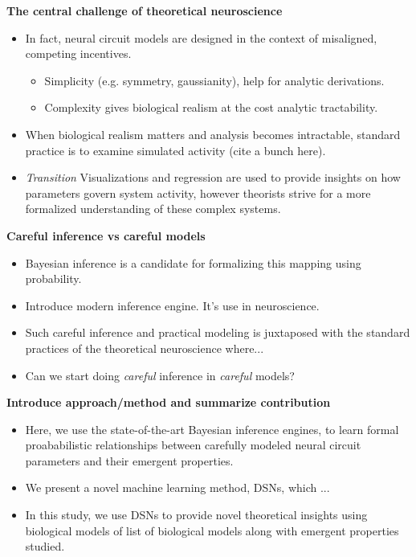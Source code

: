 \documentclass[11pt]{article}
\begin{document}
\textbf{The central challenge of theoretical neuroscience}
\begin{itemize}
\item In fact, neural circuit models are designed in the context of misaligned, competing incentives.  
\begin{itemize}
\item Simplicity (e.g. symmetry, gaussianity), help for analytic derivations.  
\item Complexity gives biological realism at the cost analytic tractability.  
\end{itemize}
\item When biological realism matters and analysis becomes intractable, standard practice is to examine simulated activity \cite{gutierrez2013multiple} (cite a bunch here).  
\item \textit{Transition} Visualizations and regression are used to provide insights on how parameters govern system activity, however theorists strive for a more formalized understanding of these complex systems.
\end{itemize}

\textbf{Careful inference vs careful models}
\begin{itemize}
\item Bayesian inference is a candidate for formalizing this mapping using probability.
\item Introduce modern inference engine.  It's use in neuroscience.
\item Such careful inference and practical modeling is juxtaposed with the standard practices of the theoretical neuroscience where... 
\item Can we start doing \textit{careful} inference in \textit{careful} models?
\end{itemize}

\textbf{Introduce approach/method and summarize contribution}
\begin{itemize}
\item Here, we use the state-of-the-art Bayesian inference engines, to learn formal proababilistic relationships between carefully modeled neural circuit parameters and their emergent properties.
\item We present a novel machine learning method, DSNs, which ...
\item  In this study, we use DSNs to provide novel theoretical insights using biological models of list of biological models along with emergent properties studied.
\end{itemize}
\end{document}
